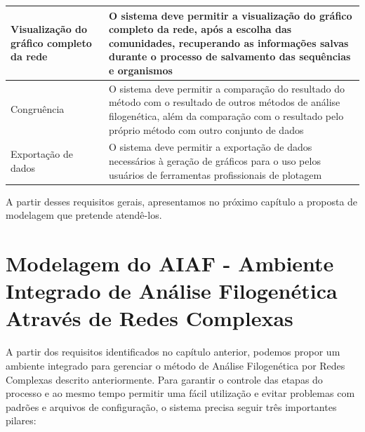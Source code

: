 \begin{table}
\begin{tabular}{p{5cm}p{10cm}}
Visualização do gráfico completo da rede & O sistema deve permitir a visualização do gráfico completo da rede, após a escolha das comunidades,
recuperando as informações salvas durante o processo de salvamento das sequências e organismos \\ \hline
Congruência & O sistema deve permitir a comparação do resultado do método com o resultado de outros métodos de análise filogenética, além da comparação
com o resultado pelo próprio método com outro conjunto de dados \\ \hline
Exportação de dados & O sistema deve permitir a exportação de dados necessários à geração de gráficos para o uso pelos usuários de ferramentas
profissionais de plotagem \\ \hline
\end{tabular}
\label{tab:requisitos}
\end{table} 

A partir desses requisitos gerais, apresentamos no próximo capítulo a proposta de modelagem que pretende atendê-los.


\chapter{Modelagem do AIAF - Ambiente Integrado de Análise Filogenética Através de Redes Complexas}
\label{cap:navi}


A partir dos requisitos identificados no capítulo anterior, podemos propor um ambiente integrado para gerenciar o método de Análise Filogenética por
Redes Complexas descrito anteriormente. Para garantir o controle das etapas do processo e ao mesmo tempo permitir uma fácil utilização e evitar problemas
com padrões e arquivos de configuração, o sistema precisa seguir três importantes pilares:

